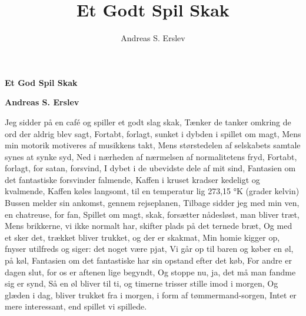 \documentclass[]{article}
\title{Et Godt Spil Skak}
\author{Andreas S. Erslev}
\begin{document}
	
	\begin{center}
		\Large\textbf{Et God Spil Skak}
	\end{center}
	
	\begin{center}
		\large\textbf{Andreas S. Erslev}
	\end{center}
	
	Jeg sidder på en café og spiller et godt slag skak,
	Tænker de tanker omkring de ord der aldrig blev sagt,
	Fortabt, forlagt, sunket i dybden i spillet om magt,
	Mens min motorik motiveres af musikkens takt,
	\newline
	\newline
	Mens størstedelen af selskabets samtale synes at synke syd,
	Ned i nærheden af nærmelsen af normalitetens fryd,
	Fortabt, forlagt, for satan, forsvind,
	I dybet i de ubevidste dele af mit sind,
	\newline
	\newline
	Fantasien om det fantastiske forsvinder falmende,
	Kaffen i kruset kradser kedeligt og kvalmende,
	Kaffen køles langsomt, til en temperatur lig
	273,15 °K (grader kelvin)
	\newline
	\newline
	Bussen melder sin ankomst, gennem rejseplanen,
	Tilbage sidder jeg med min ven, en chatreuse, for fan,
	Spillet om magt, skak, forsætter nådesløst, man bliver træt,
	Mens brikkerne, vi ikke normalt har, skifter plads på det ternede bræt,
	\newline
	\newline
	Og med et sker det, trækket bliver trukket, og der er skakmat,
	Min homie kigger op, fnyser utilfreds og siger: det noget være pjat,
	Vi går op til baren og køber en øl, på køl,
	Fantasien om det fantastiske har sin opstand efter det køb,
	\newline
	\newline
	For andre er dagen slut, for os er aftenen lige begyndt,
	Og stoppe nu, ja, det må man fandme sig er synd,
	Så en øl bliver til ti, og timerne trisser stille imod i morgen,
	Og glæden i dag, bliver trukket fra i morgen, i form af tømmermand-sorgen,
	\newline
	\newline
	Intet er mere interessant, end spillet vi spillede.
	
\end{document}
